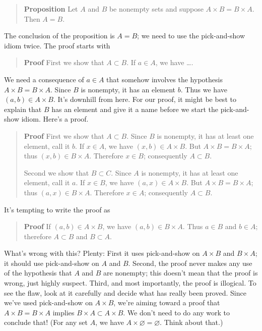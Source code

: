 \documentclass[12pt]{article}
\newcounter{ex}\setcounter{ex}{0}
\newcounter{id}\setcounter{id}{0}
\newcounter{se}\setcounter{se}{0}
\begin{document}
\begin{quote}
\textbf{Proposition} Let \(A\) and \(B\) be nonempty sets and suppose \mbox{\(A \times B
= B \times A\)}.  Then \(A = B\).
\end{quote}
The conclusion of the proposition is \(A = B\); we need to use the 
pick-and-show idiom twice. The proof starts with
\begin{quote}
 \textbf{Proof}  First we show that \(A \subset B\). If \(a \in A\), we have \dots. 
\end{quote}
We need a consequence of \(a \in A\) that somehow involves the
hypothesis \mbox{\(A \times B = B \times A\)}.  Since \(B\) is
nonempty, it has an element \(b\). Thus we have \((a,b) \in A \times
B\).  It's downhill from here. For our proof, it might be best to
explain that \(B\) has an element and give it a name before we start
the pick-and-show idiom.  Here's a proof.



\begin{quote}
 \textbf{Proof} First we show that \(A \subset B\). Since \(B\) is
 nonempty, it has at least one element, call it \(b\). If \(x \in A\), we
 have \((x,b) \in A \times B\).  But \mbox{\(A \times B = B \times A\)};
 thus \((x,b) \in B \times A\).  Therefore \(x \in B\); consequently
\(A \subset B\).

Second we show that \(B \subset C\).  Since \(A\) is
 nonempty, it has at least one element, call it \(a\). If \(x \in B\), we
 have \((a,x) \in A \times B\).  But \(A \times B = B \times A\);
 thus \((a,x) \in B \times A\).  Therefore \(x \in A\); consequently
\(A \subset B\).

\end{quote}


It's tempting to write the proof as

\begin{quote}
 \textbf{Proof} If \((a,b) \in A \times B\), we have \((a,b) \in B \times
 A\). Thus \(a \in B\) and \(b \in A\); therefore \(A \subset B\) and
\(B \subset A\).
\end{quote}

What's wrong with this? Plenty: First it uses pick-and-show on \(A
\times B\) and \(B \times A\); it should use pick-and-show on \(A\)
and \(B\). Second, the proof never makes any use of the hypothesis
that \(A\) and \(B\) are nonempty; this doesn't mean that the proof is
wrong, just highly suspect. Third, and most importantly, the proof is
illogical. To see the flaw, look at it carefully and decide
what has really been proved. Since we've used pick-and-show on \(A
\times B\), we're aiming toward a proof that  \(A \times B = B
\times A\) implies \(B \times A \subset A \times B\).  We don't need
to do any work to conclude that! (For any set \(A\), we have \(A
\times \varnothing = \varnothing\). Think about that.)
\end{document}
